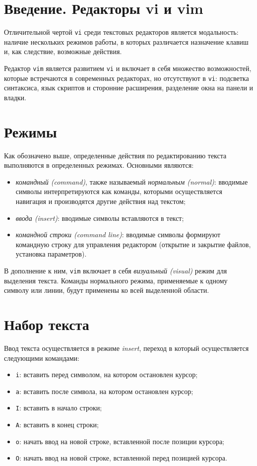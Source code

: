 \documentclass[listings]{labreport}
\begin{document}
\maketitlepage

\section*{Введение. Редакторы vi и vim}

Отличительной чертой \texttt{vi} среди текстовых редакторов является модальность:
наличие нескольких режимов работы, в которых различается назначение клавиш
и, как следствие, возможные действия.

Редактор \texttt{vim} является развитием \texttt{vi} и включает в себя
множество возможностей, которые встречаются в современных редакторах, но
отсутствуют в \texttt{vi}: подсветка синтаксиса, язык скриптов и сторонние расширения,
разделение окна на панели и владки.

\section*{Режимы}

Как обозначено выше, определенные действия по редактированию текста
выполняются в определенных режимах. Основными являются:

\begin{itemize}
\item \textit{командный (command)}, также называемый \textit{нормальным (normal)}:
  вводимые символы интерпретируются как команды, которыми осуществляется навигация
  и производятся другие действия над текстом;
\item \textit{ввода (insert)}: вводимые символы вставляются в текст;
\item \textit{командной строки (command line)}: вводимые символы формируют
  командную строку для управления редактором (открытие и закрытие файлов,
  установка параметров).
\end{itemize}

В дополнение к ним, \texttt{vim} включает в себя \textit{визуальный (visual)} режим
для выделения текста. Команды нормального режима, применяемые к одному символу или линии,
будут применены ко всей выделенной области. 

\section*{Набор текста}

Ввод текста осуществляется в режиме \textit{insert}, переход в который осуществляется
следующими командами:

\begin{itemize}
\item \texttt{i}: вставить перед символом, на котором остановлен курсор;
\item \texttt{a}: вставить после символа, на котором остановлен курсор;
\item \texttt{I}: вставить в начало строки;
\item \texttt{A}: вставить в конец строки;
\item \texttt{o}: начать ввод на новой строке, вставленной после позиции курсора;
\item \texttt{O}: начать ввод на новой строке, вставленной перед позицией курсора.
\end{itemize}
\end{document}

